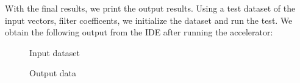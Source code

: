 \documentclass[11pt]{report}
\begin{document}
With the final results, we print the output results. Using a test dataset of the input vectors, filter coefficents, we initialize the dataset and run the test. We obtain the following output from the IDE after running the accelerator:


\begin{figure}[h!]
 	\begin{center}
 		\fboxsep=0mm
 		\caption{Input dataset}
 		\label{fig:inputResults}
 	\end{center}
 \end{figure}
 \FloatBarrier
 
\begin{figure}[h!]
 	\begin{center}
 		\fboxsep=0mm
 		\caption{Output data}
 		\label{fig:outputResults}
 	\end{center}
 \end{figure}
 \FloatBarrier
 
\end{document}
